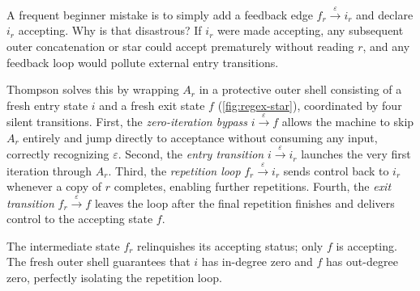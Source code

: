 A frequent beginner mistake is to simply add a feedback edge $f_r \xrightarrow{\varepsilon} i_r$ and declare $i_r$ accepting. Why is that disastrous? If $i_r$ were made accepting, any subsequent outer concatenation or star could accept prematurely without reading $r$, and any feedback loop would pollute external entry transitions.

Thompson solves this by wrapping $A_r$ in a protective outer shell consisting of a fresh entry state $i$ and a fresh exit state $f$ (\cref{fig:regex-star}), coordinated by four silent transitions. First, the \emph{zero-iteration bypass} $i \xrightarrow{\varepsilon} f$ allows the machine to skip $A_r$ entirely and jump directly to acceptance without consuming any input, correctly recognizing $\varepsilon$. Second, the \emph{entry transition} $i \xrightarrow{\varepsilon} i_r$ launches the very first iteration through $A_r$. Third, the \emph{repetition loop} $f_r \xrightarrow{\varepsilon} i_r$ sends control back to $i_r$ whenever a copy of $r$ completes, enabling further repetitions. Fourth, the \emph{exit transition} $f_r \xrightarrow{\varepsilon} f$ leaves the loop after the final repetition finishes and delivers control to the accepting state $f$.

The intermediate state $f_r$ relinquishes its accepting status; only $f$ is accepting. The fresh outer shell guarantees that $i$ has in-degree zero and $f$ has out-degree zero, perfectly isolating the repetition loop.

\begin{center}
\begin{minipage}{\linewidth}
\centering
{}
\label{fig:regex-star}
\end{minipage}
\end{center}

